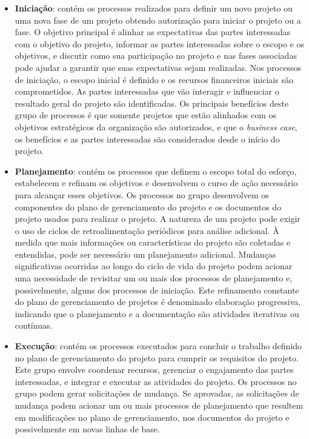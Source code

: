 \documentclass[
	12pt,
	openright,
	twoside,
	a4paper,
	english,
	brazil
	]{abntex2}
\begin{document}
\begin{itemize}
  \item \textbf{Iniciação}: contém os processos realizados para definir um novo projeto ou uma nova fase de um projeto obtendo autorização para iniciar o projeto ou a fase. O objetivo principal é alinhar as expectativas das partes interessadas com o objetivo do projeto, informar as partes interessadas sobre o escopo e os objetivos, e discutir como sua participação no projeto e nas fases associadas pode ajudar a garantir que suas expectativas sejam realizadas. Nos processos de iniciação, o escopo inicial é definido e os recursos financeiros iniciais são comprometidos. As partes interessadas que vão interagir e influenciar o resultado geral do projeto são identificadas. Os principais benefícios deste grupo de processos é que somente projetos que estão alinhados com os objetivos estratégicos da organização são autorizados, e que o \textit{business case}, os benefícios e as partes interessadas são considerados desde o início do projeto.
  \item \textbf{Planejamento}: contém os processos que definem o escopo total do esforço, estabelecem e refinam os objetivos e desenvolvem o curso de ação necessário para alcançar esses objetivos. Os processos no grupo desenvolvem os componentes do plano de gerenciamento do projeto e os documentos do projeto usados para realizar o projeto. A natureza de um projeto pode exigir o uso de ciclos de retroalimentação periódicos para análise adicional. À medida que mais informações ou características do projeto são coletadas e entendidas, pode ser necessário um planejamento adicional. Mudanças significativas ocorridas ao longo do ciclo de vida do projeto podem acionar uma necessidade de revisitar um ou mais dos processos de planejamento e, possivelmente, alguns dos processos de iniciação. Este refinamento constante do plano de gerenciamento de projetos é denominado elaboração progressiva, indicando que o planejamento e a documentação são atividades iterativas ou contínuas.
  \item \textbf{Execução}: contém os processos executados para concluir o trabalho definido no plano de gerenciamento do projeto para cumprir os requisitos do projeto. Este grupo envolve coordenar recursos, gerenciar o engajamento das partes interessadas, e integrar e executar as atividades do projeto. Os processos no grupo podem gerar solicitações de mudança. Se aprovadas, as solicitações de mudança podem acionar um ou mais processos de planejamento que resultem em modificações no plano de gerenciamento, nos documentos do projeto e possivelmente em novas linhas de base.

\end{itemize}
\end{document}
